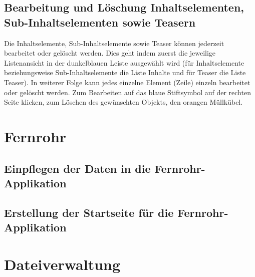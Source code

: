\subsection{Bearbeitung und Löschung Inhaltselementen, Sub-Inhaltselementen sowie Teasern}

Die Inhaltselemente, Sub-Inhaltselemente sowie Teaser können jederzeit bearbeitet oder gelöscht werden. Dies geht indem zuerst die jeweilige Listenansicht in der dunkelblauen Leiste ausgewählt wird (für Inhaltselemente beziehungsweise Sub-Inhaltselemente die Liste Inhalte und für Teaser die Liste Teaser). In weiterer Folge kann jedes einzelne Element (Zeile) einzeln bearbeitet oder gelöscht werden. Zum Bearbeiten auf das blaue Stiftsymbol auf der rechten Seite klicken, zum Löschen des gewünschten Objekts, den orangen Müllkübel.



\section{Fernrohr}

\subsection{Einpflegen der Daten in die Fernrohr-Applikation}

\subsection{Erstellung der Startseite für die Fernrohr-Applikation}

\subsection{}



\section{Dateiverwaltung}

